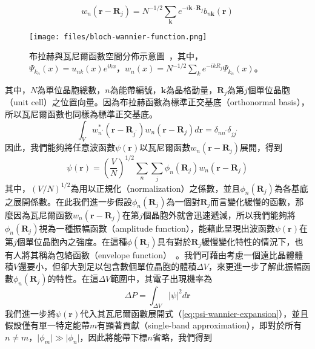 \begin{equation}
\label{eq:fourier-transform-wannier-function}
w_n(\mathbf{r}-\mathbf{R}_j)=N^{-1/2}\sum_{\mathbf{k}}e^{-i\mathbf{k}\cdot\mathbf{R}_j}b_{n\mathbf{k}}(\mathbf{r})
\end{equation}
\begin{figure}[h]
\centering
\texttt{[image: files/bloch-wannier-function.png]}
\caption[布拉赫與瓦尼爾函數空間分佈示意圖]{布拉赫與瓦尼爾函數空間分佈示意圖~\cite{marzari2012maximally}，其中，$\Psi_{k_n}(x)=u_{nk}(x)e^{ikx}$，$w_n(x)=N^{-1/2}\sum_k e^{-ikR_j}\Psi_{k_n}(x)$。}
\label{fig:tbloch-wannier-function}
\end{figure}
其中，$N$為單位晶胞總數，$n$為能帶編號，$\mathbf{k}$為晶格動量，$\mathbf{R}_j$為第$j$個單位晶胞（unit cell）之位置向量。因為布拉赫函數為標準正交基底（orthonormal basis），所以瓦尼爾函數也同樣為標準正交基底。
\begin{equation}
\label{eq:wannier-orthonormal-basis}
\int_V w_{n^\prime}^*(\mathbf{r}-\mathbf{R}_{j^\prime})w_n(\mathbf{r}-\mathbf{R}_j)d\mathbf{r}=\delta_{nn^\prime}\delta_{jj^\prime}
\end{equation}
因此，我們能夠將任意波函數$\psi(\mathbf{r})$以瓦尼爾函數$w_n(\mathbf{r}-\mathbf{R}_j)$展開，得到
\begin{equation}
\label{eq:psi-wannier-expansion}
\psi(\mathbf{r})=\left(\frac{V}{N}\right)^{1/2}\sum_n\sum_j\phi_n(\mathbf{R}_j)w_n(\mathbf{r}-\mathbf{R}_j)
\end{equation}
其中，$(V/N)^{1/2}$為用以正規化（normalization）之係數，並且$\phi_n(\mathbf{R}_j)$為各基底之展開係數。在此我們進一步假設$\phi_n(\mathbf{R}_j)$為一個對$\mathbf{R}_j$而言變化緩慢的函數，那麼因為瓦尼爾函數$w_n(\mathbf{r}-\mathbf{R}_j)$在第$j$個晶胞外就會迅速遞減，所以我們能夠將$\phi_n(\mathbf{R}_j)$視為一種振幅函數（amplitude function），能藉此呈現出波函數$\psi(\mathbf{r})$在第$j$個單位晶胞內之強度。在這種$\phi(\mathbf{R}_j)$具有對於$\mathbf{R}_j$緩慢變化特性的情況下，也有人將其稱為包絡函數（envelope function）~\cite{hurkx1989modelling}。我們可藉由考慮一個遠比晶體體積$V$還要小，但卻大到足以包含數個單位晶胞的體積$\Delta V$，來更進一步了解此振幅函數$\phi_n(\mathbf{R}_j)$的特性。在這$\Delta V$範圍中，其電子出現機率為
\begin{equation}
\Delta P=\int_{\Delta V}\vert\psi\vert^2d\mathbf{r}
\end{equation}
\hspace{2em}我們進一步將$\psi(\mathbf{r})$代入其瓦尼爾函數展開式（\ref{eq:psi-wannier-expansion}），並且假設僅有單一特定能帶$m$有顯著貢獻（single-band approximation），即對於所有$n\neq m$，$\vert\phi_m\vert\gg\vert\phi_n\vert$，因此將能帶下標$n$省略，我們得到
